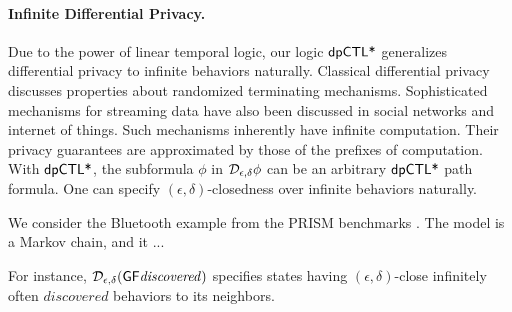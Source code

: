 \paragraph{Infinite Differential Privacy.}
Due to the power of linear temporal logic, our logic $\textsf{dpCTL*}$ generalizes differential privacy to infinite
behaviors naturally. Classical differential privacy discusses properties about
randomized terminating mechanisms. Sophisticated mechanisms for
streaming data have also been discussed in social networks and
internet of things. Such mechanisms inherently have infinite
computation. Their privacy guarantees are approximated by those of the
prefixes of computation.
With $\textsf{dpCTL*}$, the subformula $\phi$ in $\mathcal{D}_{{\epsilon}, {\delta}} \phi$
can be an arbitrary $\textsf{dpCTL*}$ path formula. One can specify
$(\epsilon, \delta)$-closedness over infinite behaviors naturally.

We consider the Bluetooth example from the PRISM benchmarks \cite{prism-bluetooth-page}. The model is a
Markov chain, and it ...

For instance,
$\mathcal{D}_{{\epsilon}, {\delta}} (\mathsf{G}   \mathsf{F} \mathit{discovered})$
specifies states having $(\epsilon, \delta)$-close
infinitely often $\mathit{discovered}$ behaviors to its neighbors.

